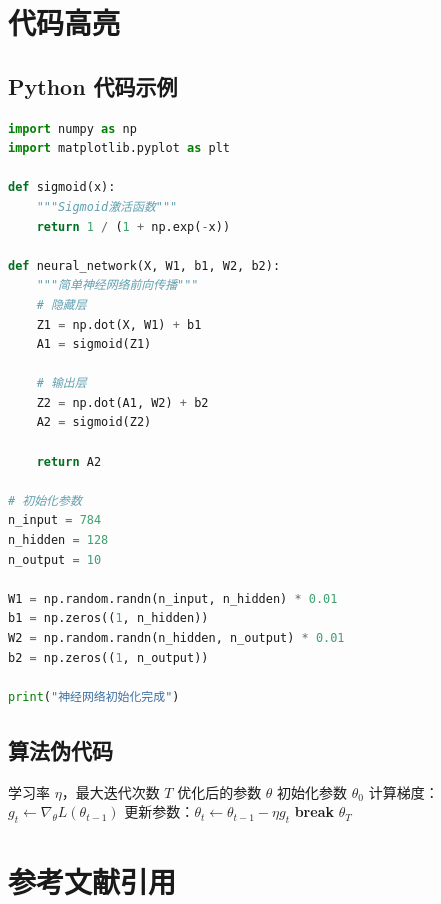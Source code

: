 \section{代码高亮}
\label{sec:code_basic}

\subsection{Python 代码示例}
\begin{lstlisting}[language=Python, caption=Python代码示例]
import numpy as np
import matplotlib.pyplot as plt

def sigmoid(x):
    """Sigmoid激活函数"""
    return 1 / (1 + np.exp(-x))

def neural_network(X, W1, b1, W2, b2):
    """简单神经网络前向传播"""
    # 隐藏层
    Z1 = np.dot(X, W1) + b1
    A1 = sigmoid(Z1)
    
    # 输出层
    Z2 = np.dot(A1, W2) + b2
    A2 = sigmoid(Z2)
    
    return A2

# 初始化参数
n_input = 784
n_hidden = 128
n_output = 10

W1 = np.random.randn(n_input, n_hidden) * 0.01
b1 = np.zeros((1, n_hidden))
W2 = np.random.randn(n_hidden, n_output) * 0.01
b2 = np.zeros((1, n_output))

print("神经网络初始化完成")
\end{lstlisting}

\subsection{算法伪代码}
\begin{algorithm}[htbp]
  \caption{梯度下降算法}
  \label{alg:gradient_descent}
  \begin{algorithmic}[1]
    \REQUIRE 学习率 $\eta$，最大迭代次数 $T$
    \ENSURE 优化后的参数 $\theta$
    \STATE 初始化参数 $\theta_0$
      \STATE 计算梯度：$g_t \leftarrow \nabla_{\theta} L(\theta_{t-1})$
      \STATE 更新参数：$\theta_t \leftarrow \theta_{t-1} - \eta g_t$
        \STATE \textbf{break} 
      \ENDIF
    \ENDFOR
    \RETURN $\theta_T$
  \end{algorithmic}
\end{algorithm}

\section{参考文献引用}
\label{sec:citation}

